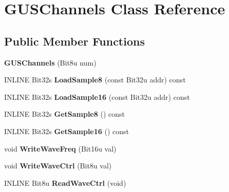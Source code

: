 \hypertarget{classGUSChannels}{\section{G\-U\-S\-Channels Class Reference}
\label{classGUSChannels}
}
\subsection*{Public Member Functions}
\begin{DoxyCompactItemize}
\item 
\hypertarget{classGUSChannels_aaa10e07b1ed3872ddb5e2db6e558e432}{{\bfseries G\-U\-S\-Channels} (Bit8u num)}\label{classGUSChannels_aaa10e07b1ed3872ddb5e2db6e558e432}

\item 
\hypertarget{classGUSChannels_a9b670af5e318bfd7578b5799c4c3dbaf}{I\-N\-L\-I\-N\-E Bit32s {\bfseries Load\-Sample8} (const Bit32u addr) const }\label{classGUSChannels_a9b670af5e318bfd7578b5799c4c3dbaf}

\item 
\hypertarget{classGUSChannels_ad213eb7324179e14c78ca08cffac5882}{I\-N\-L\-I\-N\-E Bit32s {\bfseries Load\-Sample16} (const Bit32u addr) const }\label{classGUSChannels_ad213eb7324179e14c78ca08cffac5882}

\item 
\hypertarget{classGUSChannels_a6e29dfcf0a0bfc2efe6a719a0c30bfb5}{I\-N\-L\-I\-N\-E Bit32s {\bfseries Get\-Sample8} () const }\label{classGUSChannels_a6e29dfcf0a0bfc2efe6a719a0c30bfb5}

\item 
\hypertarget{classGUSChannels_ad206f3f66b387bb11b5a238279f7a6a2}{I\-N\-L\-I\-N\-E Bit32s {\bfseries Get\-Sample16} () const }\label{classGUSChannels_ad206f3f66b387bb11b5a238279f7a6a2}

\item 
\hypertarget{classGUSChannels_a2e83b5fc88f260c2504b6e9011144e34}{void {\bfseries Write\-Wave\-Freq} (Bit16u val)}\label{classGUSChannels_a2e83b5fc88f260c2504b6e9011144e34}

\item 
\hypertarget{classGUSChannels_a1d1ae0ebc77e3958ce5e37b3cf2468dc}{void {\bfseries Write\-Wave\-Ctrl} (Bit8u val)}\label{classGUSChannels_a1d1ae0ebc77e3958ce5e37b3cf2468dc}

\item 
\hypertarget{classGUSChannels_a45ca712a5e0e1964e39f64da757f7421}{I\-N\-L\-I\-N\-E Bit8u {\bfseries Read\-Wave\-Ctrl} (void)}\label{classGUSChannels_a45ca712a5e0e1964e39f64da757f7421}


\end{DoxyCompactItemize}
